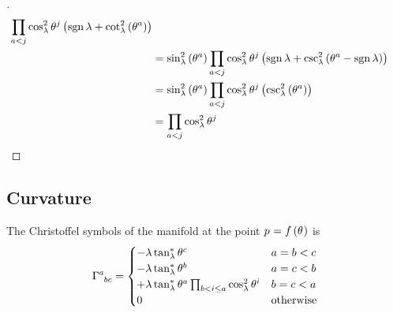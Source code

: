 \documentclass[../main.tex]{subfiles}
\begin{document}
\begin{proof}[]
\begin{align*}
\prod_{a<j}{\cos_\lambda^2\tensor{\theta}{^j}}
\left(
\sign{\lambda}
+\cot_\lambda^2\left(\tensor{\theta}{^a}
\right)
\right)\\
&=
\sin_\lambda^2\left(\tensor{\theta}{^a}\right)
\prod_{a<j}{\cos_\lambda^2\tensor{\theta}{^j}}
\left(
\sign{\lambda}
+\csc_\lambda^2\left(\tensor{\theta}{^a}
-\sign{\lambda}
\right)
\right)\\
&=
\sin_\lambda^2\left(\tensor{\theta}{^a}\right)
\prod_{a<j}{\cos_\lambda^2\tensor{\theta}{^j}}
\left(
\csc_\lambda^2\left(\tensor{\theta}{^a}
\right)
\right)\\
&=
\prod_{a<j}{\cos_\lambda^2\tensor{\theta}{^j}}
\end{align*}
\end{proof}
\subsection{Curvature}
\begin{lemma}\label{M:Christoffel}
The Christoffel symbols of the manifold
at the point \(\tensor{p}{}=f\left(\tensor{\theta}{}\right)\)
is
\[
\tensor{\Gamma}{^a_b_c}=\begin{cases}
-\lambda\tan_\lambda^\ast\tensor{\theta}{^c}&\text{\(a=b<c\)}\\
-\lambda\tan_\lambda^\ast\tensor{\theta}{^b}&\text{\(a=c<b\)}\\
+\lambda\tan_\lambda^\ast\tensor{\theta}{^a}\prod_{b<i\le a}{\cos_\lambda^2\tensor{\theta}{^i}}&\text{\(b=c<a\)}\\
0&\text{otherwise}\\
\end{cases}
\]
\end{lemma}
\end{document}
